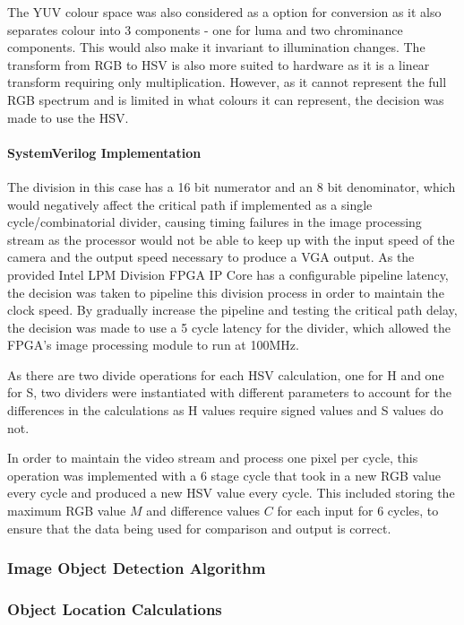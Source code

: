 \documentclass[a4paper]{article}
\begin{document}
The YUV colour space was also considered as a option for conversion as it also
separates colour into 3 components - one for luma and two chrominance components.
This would also make it invariant to illumination changes. The transform from RGB
to HSV is also more suited to hardware as it is a linear transform requiring only
multiplication. However, as it cannot represent the full RGB spectrum and is 
limited in what colours it can represent, the decision was made to use the HSV. 

\paragraph*{SystemVerilog Implementation}
The division in this case has a 16 bit numerator and an 8 bit denominator, which
would negatively affect the critical path if implemented as a single cycle/combinatorial
divider, causing timing failures in the image processing stream as the processor 
would not be able to keep up with the input speed of the camera and the
output speed necessary to produce a VGA output. As the provided Intel LPM Division FPGA 
IP Core has a configurable pipeline latency, the decision was taken to pipeline this division
process in order to maintain the clock speed. By gradually increase the pipeline 
and testing the critical path delay, the decision was made to use a 5 cycle latency
for the divider, which allowed the FPGA's image processing module to run at 100MHz. 

As there are two divide operations for each HSV calculation, one for H and one for S,
two dividers were instantiated with different parameters to account for the differences 
in the calculations as H values require signed values and S values do not. 

In order to maintain the video stream and process one pixel per cycle, this operation 
was implemented with a 6 stage cycle that took in a new RGB value every cycle and
produced a new HSV value every cycle. This included storing the maximum RGB value \( M \) and difference
values \(C \) for each input for 6 cycles, to ensure that the data being used for 
comparison and output is correct. 


   


\subsubsection{Image Object Detection Algorithm}


\subsubsection{Object Location Calculations}
\end{document}
